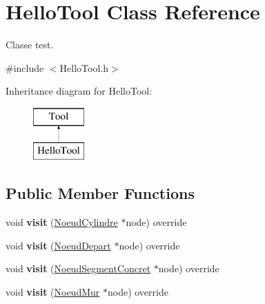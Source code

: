 \hypertarget{class_hello_tool}{}\section{Hello\+Tool Class Reference}
\label{class_hello_tool}


Classe test.  




{\ttfamily \#include $<$Hello\+Tool.\+h$>$}

Inheritance diagram for Hello\+Tool\+:\begin{figure}[H]
\begin{center}
\leavevmode
\includegraphics[height=2.000000cm]{class_hello_tool}
\end{center}
\end{figure}
\subsection*{Public Member Functions}
\begin{DoxyCompactItemize}
\item 
\hypertarget{class_hello_tool_a424b0bdaa28ba6bd7ef52d81f243b86f}{}void {\bfseries visit} (\hyperlink{class_noeud_cylindre}{Noeud\+Cylindre} $\ast$node) override\label{class_hello_tool_a424b0bdaa28ba6bd7ef52d81f243b86f}

\item 
\hypertarget{class_hello_tool_a0aa69d14dab066f514917098e4360c54}{}void {\bfseries visit} (\hyperlink{class_noeud_depart}{Noeud\+Depart} $\ast$node) override\label{class_hello_tool_a0aa69d14dab066f514917098e4360c54}

\item 
\hypertarget{class_hello_tool_ad273b09259788afbfce2fec3ccb61c6f}{}void {\bfseries visit} (\hyperlink{class_noeud_segment_concret}{Noeud\+Segment\+Concret} $\ast$node) override\label{class_hello_tool_ad273b09259788afbfce2fec3ccb61c6f}

\item 
\hypertarget{class_hello_tool_acb853bcedc7a6006c34ef50cdb5ea1cd}{}void {\bfseries visit} (\hyperlink{class_noeud_mur}{Noeud\+Mur} $\ast$node) override\label{class_hello_tool_acb853bcedc7a6006c34ef50cdb5ea1cd}

\end{DoxyCompactItemize}
